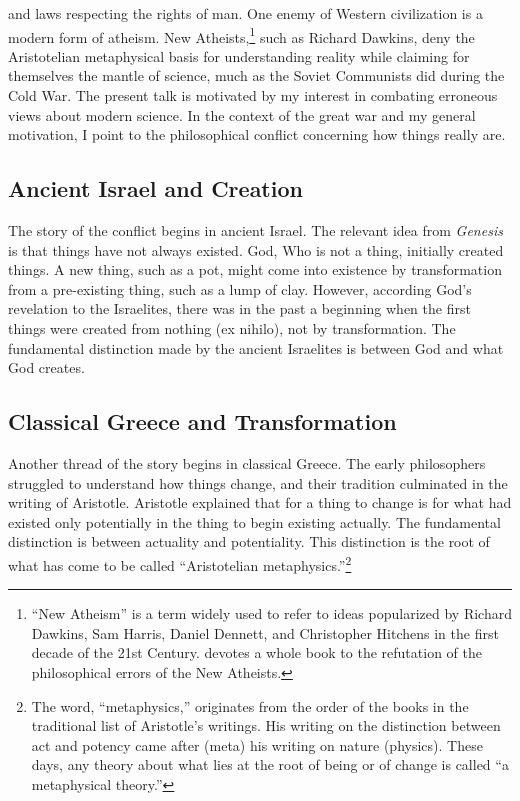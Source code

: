 \documentclass[twocolumn]{article}
\begin{document}
and laws respecting the rights of man.  One enemy of Western civilization is a
modern form of atheism.  New Atheists,\footnote{%
   ``New Atheism'' is a term widely used to refer to ideas popularized by
   Richard Dawkins, Sam Harris, Daniel Dennett, and Christopher Hitchens in the
   first decade of the 21st Century.  \cite{f2008} devotes a whole book to the
   refutation of the philosophical errors of the New Atheists.
}
such as Richard Dawkins, deny the Aristotelian metaphysical basis for
understanding reality while claiming for themselves the mantle of science, much
as the Soviet Communists did during the Cold War.  The present talk is
motivated by my interest in combating erroneous views about modern science.  In
the context of the great war and my general motivation, I point to the
philosophical conflict concerning how things really are.

\subsection{Ancient Israel and Creation}

The story of the conflict begins in ancient Israel.  The relevant idea from
{\it Genesis} is that things have not always existed.  God, Who is not a thing,
initially created things.  A new thing, such as a pot, might come into
existence by transformation from a pre-existing thing, such as a lump of clay.
However, according God's revelation to the Israelites, there was in the past a
beginning when the first things were created from nothing (ex nihilo), not by
transformation.  The fundamental distinction made by the ancient Israelites is
between God and what God creates.

\subsection{Classical Greece and Transformation}

Another thread of the story begins in classical Greece.  The early philosophers
struggled to understand how things change, and their tradition culminated in
the writing of Aristotle.  Aristotle explained that for a thing to change is
for what had existed only potentially in the thing to begin existing actually.
The fundamental distinction is between actuality and potentiality.  This
distinction is the root of what has come to be called ``Aristotelian
metaphysics.''\footnote{%
   The word, ``metaphysics,'' originates from the order of the books in the
   traditional list of Aristotle's writings.  His writing on the distinction
   between act and potency came after (meta) his writing on nature (physics).
   These days, any theory about what lies at the root of being or of change is
   called ``a metaphysical theory.''%
}
\end{document}

